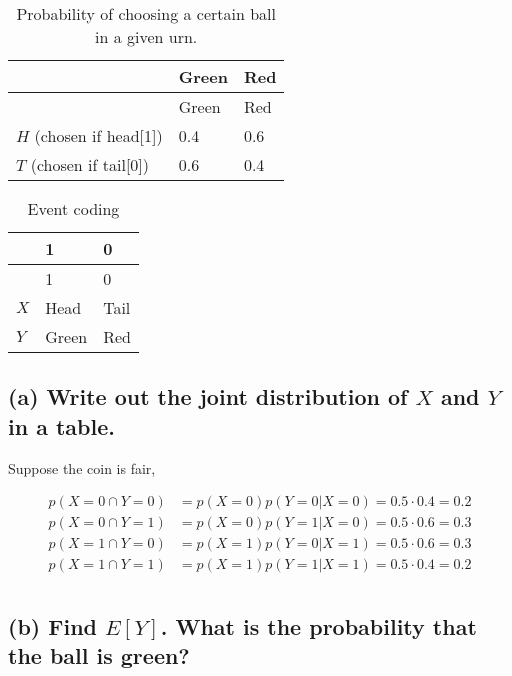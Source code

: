 \documentclass[
  letterpaper,
  DIV=11,
  numbers=noendperiod]{scrreprt}
\begin{document}
\hypertarget{tbl-balls}{}
\begin{longtable}[]{@{}lll@{}}
\caption{\label{tbl-balls}Probability of choosing a certain ball in a
given urn.}\tabularnewline
\toprule()
& Green & Red \\
\midrule()
\endfirsthead
\toprule()
& Green & Red \\
\midrule()
\endhead
\(H\) (chosen if head{[}1{]}) & 0.4 & 0.6 \\
\(T\) (chosen if tail{[}0{]}) & 0.6 & 0.4 \\
\bottomrule()
\end{longtable}

\begin{longtable}[]{@{}lll@{}}
\caption{Event coding}\tabularnewline
\toprule()
& 1 & 0 \\
\midrule()
\endfirsthead
\toprule()
& 1 & 0 \\
\midrule()
\endhead
\(X\) & Head & Tail \\
\(Y\) & Green & Red \\
\bottomrule()
\end{longtable}

\hypertarget{a-write-out-the-joint-distribution-of-x-and-y-in-a-table.}{%
\subsection{\texorpdfstring{(a) Write out the joint distribution of
\(X\) and \(Y\) in a
table.}{(a) Write out the joint distribution of X and Y in a table.}}\label{a-write-out-the-joint-distribution-of-x-and-y-in-a-table.}}

Suppose the coin is fair,

\[
\begin{aligned}
    p(X=0 \cap Y=0) &= p(X=0) p(Y=0|X=0)= 0.5\cdot 0.4 = 0.2\\
    p(X=0 \cap Y=1) &= p(X=0) p(Y=1|X=0)= 0.5\cdot 0.6 = 0.3\\
    p(X=1 \cap Y=0) &= p(X=1) p(Y=0|X=1)= 0.5\cdot 0.6 = 0.3\\
    p(X=1 \cap Y=1) &= p(X=1) p(Y=1|X=1)= 0.5\cdot 0.4 = 0.2\\
\end{aligned}
\]

\hypertarget{b-find-ey.-what-is-the-probability-that-the-ball-is-green}{%
\subsection{\texorpdfstring{(b) Find \(E[Y]\). What is the probability
that the ball is
green?}{(b) Find E{[}Y{]}. What is the probability that the ball is green?}}\label{b-find-ey.-what-is-the-probability-that-the-ball-is-green}}
\end{document}
